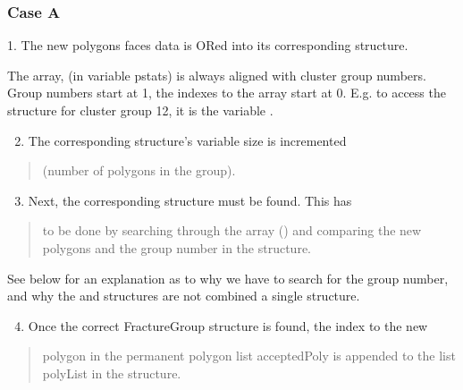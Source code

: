 \documentclass[letterpaper,10pt,english]{sphinxmanual}
\begin{document}
\subsubsection{Case A}
\label{dfngen:case-a}
1.      The new polygons faces data is ORed into its corresponding
 structure.

The  array, (in variable pstats) is always aligned with cluster
group numbers. Group numbers start at 1, the indexes to the array start at 0.
E.g. to access the  structure for cluster group 12, it is the
variable .
\begin{enumerate}
\setcounter{enumi}{1}
\item {} 
The corresponding  structure’s variable size is incremented

\end{enumerate}
\begin{quote}

(number of polygons in the group).
\end{quote}
\begin{enumerate}
\setcounter{enumi}{2}
\item {} 
Next, the corresponding  structure must be found. This has

\end{enumerate}
\begin{quote}

to be done by searching through the array () and
comparing the new polygons  and the group number in the
 structure.
\end{quote}

See below for an explanation as to why we have to search for the group number,
and why the  and  structures are not combined a
single structure.
\begin{enumerate}
\setcounter{enumi}{3}
\item {} 
Once the correct FractureGroup structure is found, the index to the new

\end{enumerate}
\begin{quote}

polygon in the permanent polygon list acceptedPoly is appended to the list
polyList in the  structure.
\end{quote}
\end{document}
